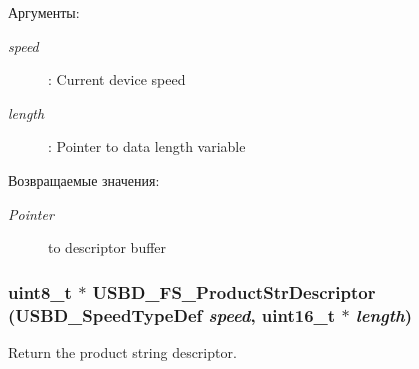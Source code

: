 \begin{Desc}
\item[Аргументы:]
\begin{description}
\item[{\em speed}]: Current device speed \item[{\em length}]: Pointer to data length variable \end{description}
\end{Desc}
\begin{Desc}
\item[Возвращаемые значения:]
\begin{description}
\item[{\em Pointer}]to descriptor buffer \end{description}
\end{Desc}
\hypertarget{group___u_s_b_d___d_e_s_c___private___functions_g0ec558c0303daabb851d584109a56514}{
\subsubsection[{USBD\_\-FS\_\-ProductStrDescriptor}]{\setlength{\rightskip}{0pt plus 5cm}uint8\_\-t $\ast$ USBD\_\-FS\_\-ProductStrDescriptor (USBD\_\-SpeedTypeDef {\em speed}, \/  uint16\_\-t $\ast$ {\em length})}}
\label{group___u_s_b_d___d_e_s_c___private___functions_g0ec558c0303daabb851d584109a56514}


Return the product string descriptor. 

